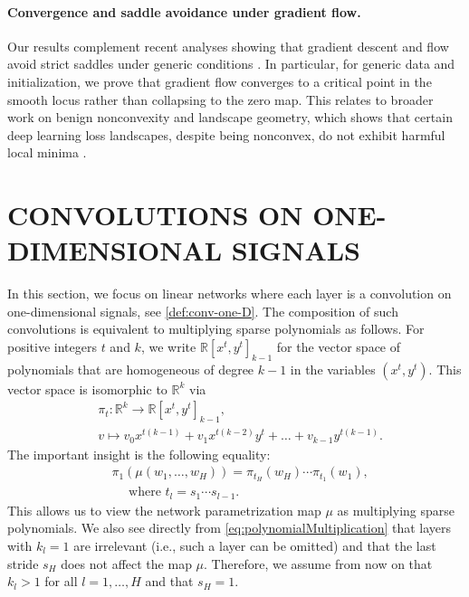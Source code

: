 \documentclass[twoside]{article}
\theoremstyle{definition}
\theoremstyle{remark}
\begin{document}
\paragraph{Convergence and saddle avoidance under gradient flow.}
Our results complement recent analyses showing that gradient descent and flow avoid strict saddles under generic conditions \cite{lee2016gradient,panageas2016gradient,bah2022learning}. In particular, for generic data and initialization, we prove that gradient flow converges to a critical point in the smooth locus rather than collapsing to the zero map. This relates to broader work on benign nonconvexity and landscape geometry, which shows that certain deep learning loss landscapes, despite being nonconvex, do not exhibit harmful local minima \cite{DuICLR,Kawaguchi,choromanska15}.



\section{CONVOLUTIONS ON ONE-DIMENSIONAL SIGNALS}
\label{sec:oneDim}

In this section, we focus on linear networks where each layer is a convolution on one-dimensional signals, see \eqref{def:conv-one-D}.
The composition of such convolutions is equivalent to multiplying sparse polynomials as follows.
For positive integers $t$ and $k$, we write $\mathbb{R}[x^t,y^t]_{k-1}$ for the vector space of polynomials that are homogeneous of degree $k-1$ in the variables $(x^t,y^t)$.
This vector space is isomorphic to $\mathbb{R}^k$ via
\begin{align*}
    &\pi_t: \mathbb{R}^k \to \mathbb{R}[x^t,y^t]_{k-1}, \\
    &v \mapsto v_0 x^{t(k-1)} + v_1 x^{t(k-2)} y^t + \ldots  + v_{k-1} y^{t(k-1)}.
\end{align*}
The important insight is the following equality:
\begin{align}
\label{eq:polynomialMultiplication}
    &\pi_1(\mu(w_1, \ldots, w_H)) = \pi_{t_H}(w_H) \cdots \pi_{t_1}(w_1), \\ &\quad \text{ where }
    t_l = s_1 \cdots s_{l-1}. \nonumber
\end{align}
This allows us to view the network parametrization map $\mu$ as multiplying sparse polynomials.
We also see directly from \eqref{eq:polynomialMultiplication} that layers with $k_l=1$ are irrelevant (i.e., such a layer can be omitted) and that the last stride $s_H$ does not affect the map $\mu$. 
Therefore, we assume from now on that $k_l>1$ for all $l = 1, \ldots, H$ and that $s_H = 1$.
\end{document}
